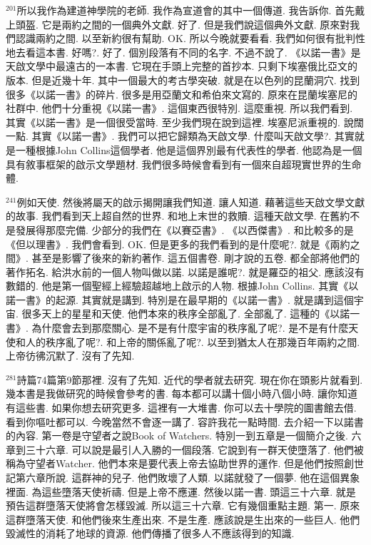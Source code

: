 \documentclass{book}
\begin{document}
$^{201}$所以我作為建道神學院的老師.
我作為宣道會的其中一個傳道.
我告訴你.
首先戴上頭盔.
它是兩約之間的一個典外文獻.
好了.
但是我們說這個典外文獻.
原來對我們認識兩約之間.
以至新約很有幫助.
OK.
所以今晚就要看看.
我們如何很有批判性地去看這本書.
好嗎?.
好了.
個別段落有不同的名字.
不過不說了.
《以諾一書》是天啟文學中最遠古的一本書.
它現在手頭上完整的首抄本.
只剩下埃塞俄比亞文的版本.
但是近幾十年.
其中一個最大的考古學突破.
就是在以色列的昆蘭洞穴.
找到很多《以諾一書》的碎片.
很多是用亞蘭文和希伯來文寫的.
原來在昆蘭埃塞尼的社群中.
他們十分重視《以諾一書》.
這個東西很特別.
這麼重視.
所以我們看到.
其實《以諾一書》是一個很受當時.
至少我們現在說到這裡.
埃塞尼派重視的.
說闊一點.
其實《以諾一書》.
我們可以把它歸類為天啟文學.
什麼叫天啟文學?.
其實就是一種根據John Collins這個學者.
他是這個界別最有代表性的學者.
他認為是一個具有敘事框架的啟示文學題材.
我們很多時候會看到有一個來自超現實世界的生命體.

$^{241}$例如天使.
然後將屬天的啟示揭開讓我們知道.
讓人知道.
藉著這些天啟文學文獻的故事.
我們看到天上超自然的世界.
和地上末世的救贖.
這種天啟文學.
在舊約不是發展得那麼完備.
少部分的我們在《以賽亞書》.
《以西傑書》.
和比較多的是《但以理書》.
我們會看到.
OK.
但是更多的我們看到的是什麼呢?.
就是《兩約之間》.
甚至是影響了後來的新約著作.
這五個書卷.
剛才說的五卷.
都全部將他們的著作拓名.
給洪水前的一個人物叫做以諾.
以諾是誰呢?.
就是羅亞的祖父.
應該沒有數錯的.
他是第一個聖經上經驗超越地上啟示的人物.
根據John Collins.
其實《以諾一書》的起源.
其實就是講到.
特別是在最早期的《以諾一書》.
就是講到這個宇宙.
很多天上的星星和天使.
他們本來的秩序全部亂了.
全部亂了.
這種的《以諾一書》.
為什麼會去到那麼關心.
是不是有什麼宇宙的秩序亂了呢?.
是不是有什麼天使和人的秩序亂了呢?.
和上帝的關係亂了呢?.
以至到猶太人在那幾百年兩約之間.
上帝彷彿沉默了.
沒有了先知.

$^{281}$詩篇74篇第9節那裡.
沒有了先知.
近代的學者就去研究.
現在你在頭影片就看到.
幾本書是我做研究的時候會參考的書.
每本都可以講十個小時八個小時.
讓你知道有這些書.
如果你想去研究更多.
這裡有一大堆書.
你可以去十學院的圖書館去借.
看到你嘔吐都可以.
今晚當然不會逐一講了.
容許我花一點時間.
去介紹一下以諾書的內容.
第一卷是守望者之說Book of Watchers.
特別一到五章是一個簡介之後.
六章到三十六章.
可以說是最引人入勝的一個段落.
它說到有一群天使墮落了.
他們被稱為守望者Watcher.
他們本來是要代表上帝去協助世界的運作.
但是他們按照創世記第六章所說.
這群神的兒子.
他們敗壞了人類.
以諾就發了一個夢.
他在這個異象裡面.
為這些墮落天使祈禱.
但是上帝不應運.
然後以諾一書.
頭這三十六章.
就是預告這群墮落天使將會怎樣毀滅.
所以這三十六章.
它有幾個重點主題.
第一.
原來這群墮落天使.
和他們後來生產出來.
不是生產.
應該說是生出來的一些巨人.
他們毀滅性的消耗了地球的資源.
他們傳播了很多人不應該得到的知識.
\end{document}
